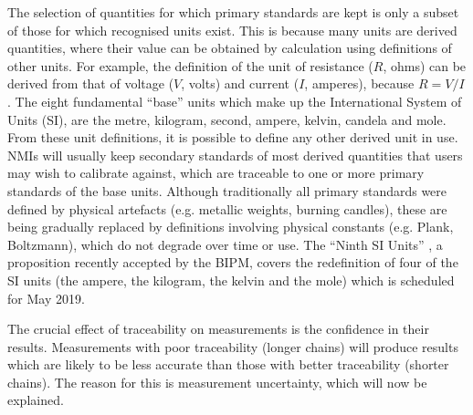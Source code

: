 \documentclass[../thesis/thesis.tex]{subfiles}
\begin{document}
The selection of quantities for which primary standards are kept is only a subset of those for which recognised units exist. This is because many units are derived quantities, where their value can be obtained by calculation using definitions of other units. For example, the definition of the unit of resistance ($R$, ohms) can be derived from that of voltage ($V$, volts) and current ($I$, amperes), because $R=V/I$. The eight fundamental ``base'' units which make up the International System of Units (SI), are the metre, kilogram, second, ampere, kelvin, candela and mole. From these unit definitions, it is possible to define any other derived unit in use. NMIs will usually keep secondary standards of most derived quantities that users may wish to calibrate against, which are traceable to one or more primary standards of the base units. Although traditionally all primary standards were defined by physical artefacts (e.g. metallic weights, burning candles), these are being gradually replaced by definitions involving physical constants (e.g. Plank, Boltzmann), which do not degrade over time or use. The ``Ninth SI Units'' \cite{SI}, a proposition recently accepted by the BIPM, covers the redefinition of four of the SI units (the ampere, the kilogram, the kelvin and the mole) which is scheduled for May 2019.

The crucial effect of traceability on measurements is the confidence in their results. Measurements with poor traceability (longer chains) will produce results which are likely to be less accurate than those with better traceability (shorter chains). The reason for this is measurement uncertainty, which will now be explained.
\end{document}
